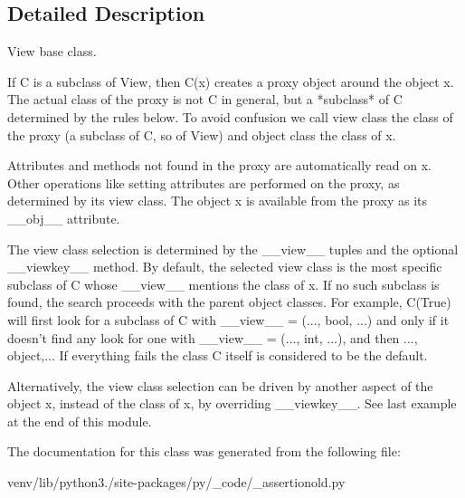 \subsection{Detailed Description}
\begin{DoxyVerb}View base class.

If C is a subclass of View, then C(x) creates a proxy object around
the object x.  The actual class of the proxy is not C in general,
but a *subclass* of C determined by the rules below.  To avoid confusion
we call view class the class of the proxy (a subclass of C, so of View)
and object class the class of x.

Attributes and methods not found in the proxy are automatically read on x.
Other operations like setting attributes are performed on the proxy, as
determined by its view class.  The object x is available from the proxy
as its __obj__ attribute.

The view class selection is determined by the __view__ tuples and the
optional __viewkey__ method.  By default, the selected view class is the
most specific subclass of C whose __view__ mentions the class of x.
If no such subclass is found, the search proceeds with the parent
object classes.  For example, C(True) will first look for a subclass
of C with __view__ = (..., bool, ...) and only if it doesn't find any
look for one with __view__ = (..., int, ...), and then ..., object,...
If everything fails the class C itself is considered to be the default.

Alternatively, the view class selection can be driven by another aspect
of the object x, instead of the class of x, by overriding __viewkey__.
See last example at the end of this module.
\end{DoxyVerb}
 

The documentation for this class was generated from the following file\+:\begin{DoxyCompactItemize}
\item 
venv/lib/python3./site-\/packages/py/\+\_\+code/\+\_\+assertionold.\+py\end{DoxyCompactItemize}
